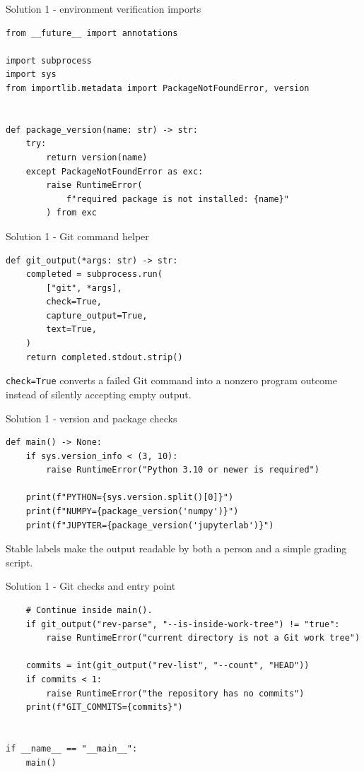 \documentclass[aspectratio=169,11pt]{beamer}
\begin{document}
\begin{frame}[fragile]{Solution 1 - environment verification imports}
\begin{lstlisting}
from __future__ import annotations

import subprocess
import sys
from importlib.metadata import PackageNotFoundError, version


def package_version(name: str) -> str:
    try:
        return version(name)
    except PackageNotFoundError as exc:
        raise RuntimeError(
            f"required package is not installed: {name}"
        ) from exc
\end{lstlisting}
\end{frame}

\begin{frame}[fragile]{Solution 1 - Git command helper}
\begin{lstlisting}
def git_output(*args: str) -> str:
    completed = subprocess.run(
        ["git", *args],
        check=True,
        capture_output=True,
        text=True,
    )
    return completed.stdout.strip()
\end{lstlisting}
\answerlabel \texttt{check=True} converts a failed Git command into a nonzero
program outcome instead of silently accepting empty output.
\end{frame}

\begin{frame}[fragile]{Solution 1 - version and package checks}
\begin{lstlisting}
def main() -> None:
    if sys.version_info < (3, 10):
        raise RuntimeError("Python 3.10 or newer is required")

    print(f"PYTHON={sys.version.split()[0]}")
    print(f"NUMPY={package_version('numpy')}")
    print(f"JUPYTER={package_version('jupyterlab')}")
\end{lstlisting}
\answerlabel Stable labels make the output readable by both a person and a
simple grading script.
\end{frame}

\begin{frame}[fragile]{Solution 1 - Git checks and entry point}
\begin{lstlisting}
    # Continue inside main().
    if git_output("rev-parse", "--is-inside-work-tree") != "true":
        raise RuntimeError("current directory is not a Git work tree")

    commits = int(git_output("rev-list", "--count", "HEAD"))
    if commits < 1:
        raise RuntimeError("the repository has no commits")
    print(f"GIT_COMMITS={commits}")


if __name__ == "__main__":
    main()
\end{lstlisting}
\end{frame}
\end{document}
